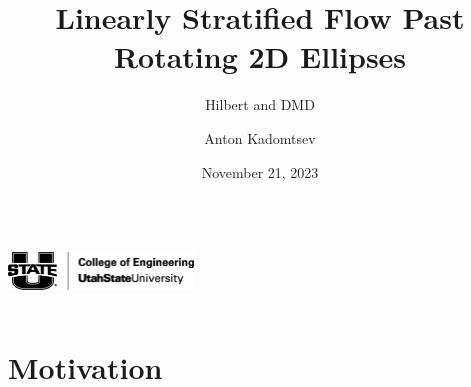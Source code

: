 \documentclass[aspectratio=169,xcolor=dvipsnames]{beamer}
\title[short title]{Linearly Stratified Flow Past Rotating 2D Ellipses}
\subtitle{Hilbert and DMD}
\author[Anton] {Anton Kadomtsev}
\institute[USU] %
{
    Department of Mechanical and Aerospace Engineering
    \vskip 3pt
}
\date{November 21, 2023} %
\begin{document}
\begin{frame}
    \titlepage
    \begin{columns}[c]
            \includegraphics[height=1.0cm]{figures/u-state-black.png}
        
        \begin{figure}
        \end{figure}

    \end{columns}     
    
\end{frame}


\section{Motivation}
\end{document}
